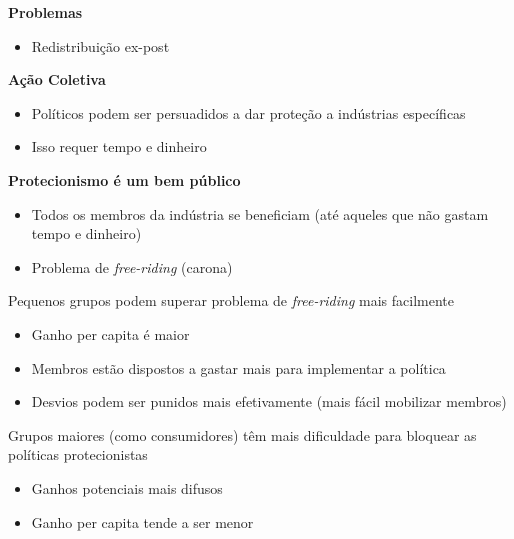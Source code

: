 \documentclass[a4paper,12pt]{article}[abntex2]
\begin{document}
\textbf{Problemas}
\begin{itemize}
  \item Redistribuição ex-post
\end{itemize}

\textbf{Ação Coletiva}
\begin{itemize}
  \item Políticos podem ser persuadidos a dar proteção a indústrias específicas
  \item Isso requer tempo e dinheiro
\end{itemize}

\textbf{Protecionismo é um bem público}
\begin{itemize}
  \item Todos os membros da indústria se beneficiam (até aqueles que não gastam tempo e dinheiro)
  \item Problema de \textit{free-riding} (carona)
\end{itemize}

Pequenos grupos podem superar problema de \textit{free-riding} mais facilmente
\begin{itemize}
  \item Ganho per capita é maior
  \item Membros estão dispostos a gastar mais para implementar a política
  \item Desvios podem ser punidos mais efetivamente (mais fácil mobilizar membros)
\end{itemize}

Grupos maiores (como consumidores) têm mais dificuldade para bloquear as políticas protecionistas
\begin{itemize}
  \item Ganhos potenciais mais difusos
  \item Ganho per capita tende a ser menor
\end{itemize}
\end{document}
